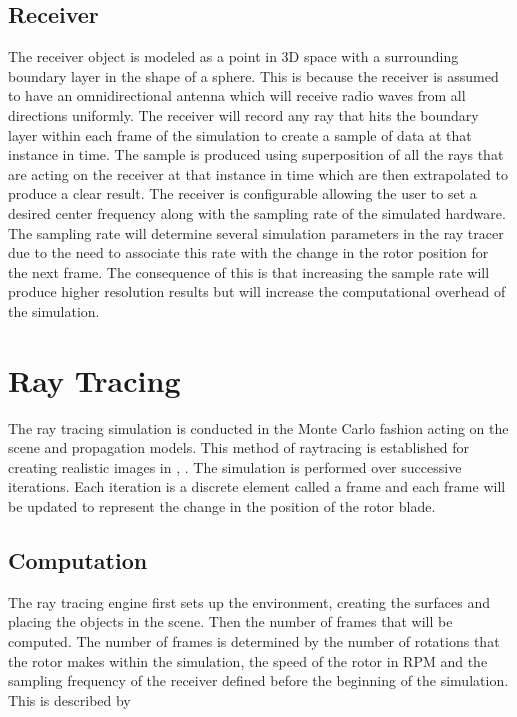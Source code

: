\subsection{Receiver}
The receiver object is modeled as a point in 3D space with a surrounding boundary layer in the shape of a sphere. This is because the receiver is assumed to have an omnidirectional antenna which will receive radio waves from all directions uniformly. The receiver will record any ray that hits the boundary layer within each frame of the simulation to create a sample of data at that instance in time.
The sample is produced using superposition of all the rays that are acting on the receiver at that instance in time which are then extrapolated to produce a clear result.
The receiver is configurable allowing the user to set a desired center frequency along with the sampling rate of the simulated hardware. The sampling rate will determine several simulation parameters in the ray tracer due to the need to associate this rate with the change in the rotor position for the next frame. The consequence of this is that increasing the sample rate will produce higher resolution results but will increase the computational overhead of the simulation.

\section{Ray Tracing}
The ray tracing simulation is conducted in the Monte Carlo fashion acting on the scene and propagation models. This method of raytracing is established for creating realistic images in \cite{Suffern2007}, \cite{Pharr2010}. The simulation is performed over successive iterations. Each iteration is a discrete element called a frame and each frame will be updated to represent the change in the position of the rotor blade.

\subsection{Computation}
The ray tracing engine first sets up the environment, creating the surfaces and placing the objects in the scene. Then the number of frames that will be computed. The number of frames is determined by the number of rotations that the rotor makes within the simulation, the speed of the rotor in RPM and the sampling frequency of the receiver defined before the beginning of the simulation. This is described by

